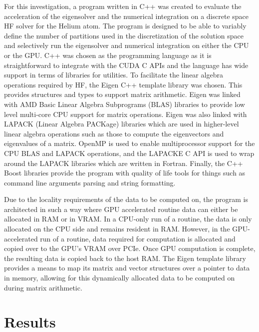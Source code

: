 \documentclass[journal, twoside]{IEEEtran}
\begin{document}
For this investigation, a program written in C++ was created to evaluate the acceleration of the eigensolver and the numerical integration on a discrete space HF solver for the Helium atom. The program is designed to be able to variably define the number of partitions used in the discretization of the solution space and selectively run the eigensolver and numerical integration on either the CPU or the GPU. C++ was chosen as the programming language as it is straightforward to integrate with the CUDA C APIs and the language has wide support in terms of libraries for utilities. To facilitate the linear algebra operations required by HF, the Eigen \cite{eigen} C++ template library was chosen. This provides structures and types to support matrix arithmetic. Eigen was linked with AMD Basic Linear Algebra Subprograms (BLAS) libraries \cite{amd-blas} to provide low level multi-core CPU support for matrix operations. Eigen was also linked with LAPACK (Linear Algebra PACKage) \cite{lapack} libraries which are used in higher-level linear algebra operations such as those to compute the eigenvectors and eigenvalues of a matrix. OpenMP is used to enable multiprocessor support for the CPU BLAS and LAPACK operations, and the LAPACKE C API is used to wrap around the LAPACK libraries which are written in Fortran. Finally, the C++ Boost libraries provide the program with quality of life tools for things such as command line arguments parsing and string formatting.

Due to the locality requirements of the data to be computed on, the program is architected in such a way where GPU accelerated routine data can either be allocated in RAM or in VRAM. In a CPU-only run of a routine, the data is only allocated on the CPU side and remains resident in RAM. However, in the GPU-accelerated run of a routine, data required for computation is allocated and copied over to the GPU's VRAM over PCIe. Once GPU computation is complete, the resulting data is copied back to the host RAM. The Eigen template library provides a means to map its matrix and vector structures over a pointer to data in memory, allowing for this dynamically allocated data to be computed on during matrix arithmetic.


\section{Results}
\end{document}
